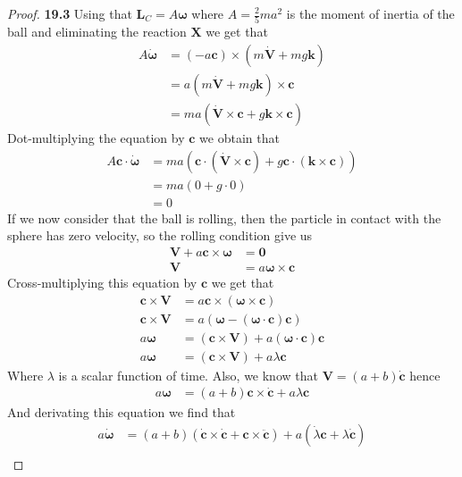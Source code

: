 \documentclass[11pt]{article}
\newcommand{\uvk}{\bm{k}}
\theoremstyle{definition}
\begin{document}
\begin{proof}{\textbf{19.3}}
    Using that $\bm{L}_C = A\bm{\omega}$ where $A = \frac{2}{5}ma^2$ is the
    moment of inertia of the ball and eliminating the reaction
    $\bm{X}$ we get that
    \begin{align*}
        A\bm{\dot{\omega}}
        &= (-a\bm{c}) \times (m\bm{\dot{V}} + mg\bm{k})\\
        &= a(m\bm{\dot{V}} + mg\uvk) \times \bm{c}\\
        &= ma(\bm{\dot{V}} \times \bm{c} + g\uvk \times \bm{c})
    \end{align*}
    Dot-multiplying the equation by $\bm{c}$ we obtain that
    \begin{align*}
        A\bm{c}\cdot\bm{\dot{\omega}}
        &= ma(\bm{c}\cdot(\bm{\dot{V}} \times \bm{c}) + g\bm{c}\cdot(\uvk \times \bm{c}))\\
        &= ma(0 + g\cdot 0)\\
        &= 0        
    \end{align*}
    If we now consider that the ball is rolling, then the particle in
    contact with the sphere has zero velocity, so the rolling condition give
    us
    \begin{align*}
        \bm{V} + a\bm{c} \times \bm{\omega} &= \bm{0}\\
        \bm{V} &= a\bm{\omega} \times \bm{c}
    \end{align*}
    Cross-multiplying this equation by $\bm{c}$ we get that
    \begin{align*}
        \bm{c} \times \bm{V} &= a\bm{c} \times (\bm{\omega} \times \bm{c})\\
        \bm{c} \times \bm{V} &= a(\bm{\omega} - (\bm{\omega} \cdot \bm{c})\bm{c})\\
        a\bm{\omega} &= (\bm{c} \times \bm{V}) + a(\bm{\omega} \cdot \bm{c})\bm{c}\\
        a\bm{\omega} &= (\bm{c} \times \bm{V}) + a\lambda\bm{c}
    \end{align*}
    Where $\lambda$ is a scalar function of time. 
    Also, we know that $\bm{V} = (a + b) \bm{\dot c}$ hence
    \begin{align*}
        a\bm{\omega} &= (a + b)\bm{c} \times \bm{\dot c} + a\lambda\bm{c}
    \end{align*}
    And derivating this equation we find that
    \begin{align*}
        a\bm{\dot \omega}
        &= (a + b)(\bm{\dot c} \times \bm{\dot c} + \bm{c} \times \bm{\ddot c})
        + a(\dot\lambda\bm{c} + \lambda\bm{\dot c})\\

\end{align*}
\end{proof}
\end{document}
